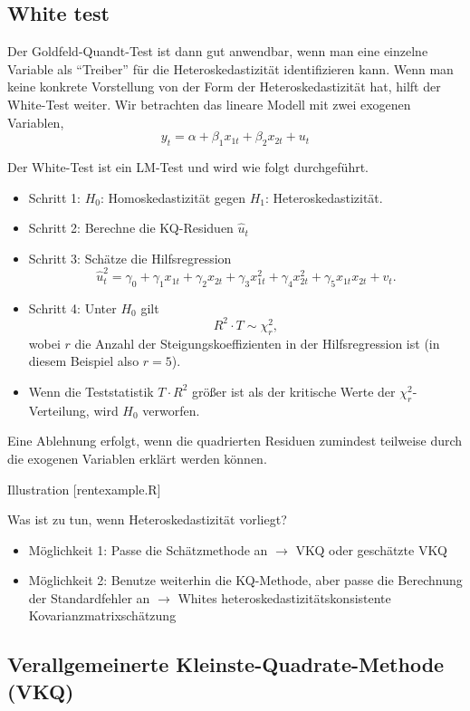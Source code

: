 \documentclass{article}
\begin{document}
\subsection*{White test}

Der Goldfeld-Quandt-Test ist dann gut anwendbar, wenn man eine einzelne
Variable als "`Treiber"' für die Heteroskedastizität identifizieren kann.
Wenn man keine konkrete Vorstellung von der Form der Heteroskedastizität
hat, hilft der White-Test weiter. Wir betrachten das lineare Modell
mit zwei exogenen Variablen,
\[ y_{t}=\alpha +\beta _{1}x_{1t}+\beta _{2}x_{2t}+u_{t} \]

Der White-Test ist ein LM-Test und wird wie folgt durchgeführt.
\begin{itemize}
	\item Schritt 1: $H_{0}$: Homoskedastizität gegen $H_1$: Heteroskedastizität.
	\item Schritt 2: Berechne die KQ-Residuen $\hat{u}_{t}$
	\item Schritt 3: Schätze die Hilfsregression
	\[ \hat{u}_t^2 = \gamma_0+\gamma_1 x_{1t}+\gamma_2 x_{2t}
	+\gamma_3 x_{1t}^2+\gamma_4 x_{2t}^2 +\gamma_5 x_{1t}x_{2t}+v_t. \]
	\item Schritt 4: Unter $H_{0}$ gilt
	\[ R^{2}\cdot T\sim \chi_r^2, \]
	wobei $r$ die Anzahl der Steigungskoeffizienten in der Hilfsregression ist 
	(in diesem Beispiel also $r=5$).
	\item Wenn die Teststatistik $T\cdot R^2$ größer ist als der kritische Werte
	der $\chi_r^2$-Verteilung, wird $H_{0}$ verworfen.
\end{itemize}
Eine Ablehnung erfolgt, wenn die quadrierten Residuen zumindest teilweise
durch die exogenen Variablen erklärt werden können.

Illustration [rentexample.R]

Was ist zu tun, wenn Heteroskedastizität vorliegt?

\begin{itemize}
	\item Möglichkeit 1: Passe die Schätzmethode an $\longrightarrow $ VKQ oder geschätzte VKQ
	\item Möglichkeit 2: Benutze weiterhin die KQ-Methode, aber passe die Berechnung
	der Standardfehler an $\longrightarrow $ Whites heteroskedastizitätskonsistente 
	Kovarianzmatrixschätzung
\end{itemize}

\subsection*{Verallgemeinerte Kleinste-Quadrate-Methode (VKQ)}
\end{document}
